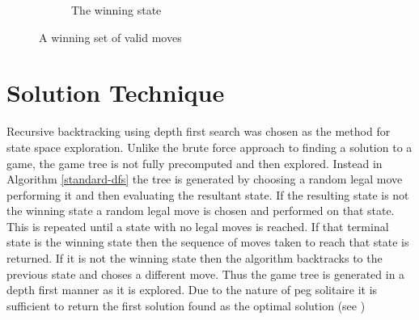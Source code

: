 \documentclass[10pt]{article}
\begin{document}
\begin{figure}[ht]
\begin{subfigure}[t]{0.3\textwidth}
{      
    }
    \caption{The winning state}
  \end{subfigure}
  \caption{A winning set of valid moves}
\end{figure}
\newpage
\section{Solution Technique}
Recursive backtracking using depth first search was chosen as the method for state space exploration. Unlike the brute force approach to finding a solution to a game, the game tree is not fully precomputed and then explored. Instead in Algorithm \ref{standard-dfs} the tree is generated by choosing a random legal move performing it and then evaluating the resultant state. If the resulting state is not the winning state a random legal move is chosen and performed on that state. This is repeated until a state with no legal moves is reached. If that terminal state is the winning state then the sequence of moves taken to reach that state is returned. If it is not the winning state then the algorithm backtracks to the previous state and choses a different move. Thus the game tree is generated in a depth first manner as it is explored. Due to the nature of peg solitaire it is sufficient to return the first solution found as the optimal solution (see )
\end{document}
